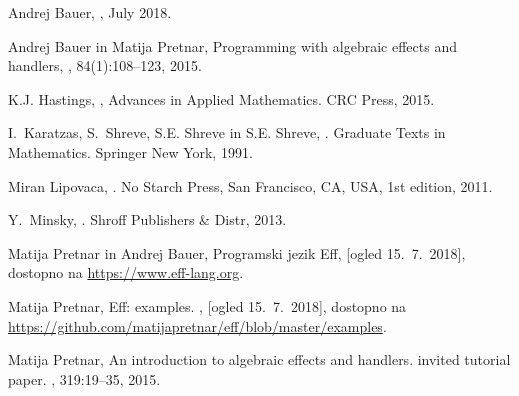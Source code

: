 \documentclass[a4paper,12pt]{article}
\theoremstyle{definition} %
\begin{document}
\begin{thebibliography}{1}

Andrej Bauer,
, July 2018.

Andrej Bauer in Matija Pretnar,
\newblock Programming with algebraic effects and handlers,
,
  84(1):108--123, 2015.

K.J. Hastings,
,
\newblock Advances in Applied Mathematics. CRC Press, 2015.

I.~Karatzas, S.~Shreve, S.E. Shreve in S.E. Shreve,
.
\newblock Graduate Texts in Mathematics. Springer New York, 1991.

Miran Lipovaca,
.
\newblock No Starch Press, San Francisco, CA, USA, 1st edition, 2011.

Y.~Minsky,
.
\newblock Shroff Publishers \& Distr, 2013.

Matija Pretnar in Andrej Bauer,
\newblock Programski jezik Eff, [ogled 15.~7.~2018], dostopno na \url{https://www.eff-lang.org}.

Matija Pretnar,
\newblock Eff: examples.
,
[ogled 15.~7.~2018], dostopno na \url{https://github.com/matijapretnar/eff/blob/master/examples}.


Matija Pretnar,
\newblock An introduction to algebraic effects and handlers. invited tutorial
  paper.
, 319:19--35,
  2015.

\end{thebibliography}
\end{document}
